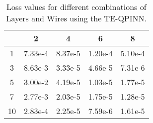 \documentclass{article}
\begin{document}
    
    \begin{table}[h]
    \centering
    \begin{tabular}{@{}c S[table-format=1.2e-1,mode=text] S[table-format=1.2e-1,mode=text] S[table-format=1.2e-1,mode=text] S[table-format=1.2e-1,mode=text]@{}}
    \toprule
     & {2} & {4} & {6} & {8} \\
      & 7.33e-4 & 8.37e-5 & 1.20e-4 & 5.10e-4 \\
    3  & 8.63e-3 & 3.33e-5 & 4.66e-5 & 7.31e-6 \\
    5  & 3.00e-2 & 4.19e-5 & 1.03e-5 & 1.77e-5 \\
    7  & 2.77e-3 & 2.03e-5 & 1.75e-5 & 1.28e-5 \\
    10 & 2.83e-4 & 2.25e-5 & 7.59e-6 & 1.61e-5 \\
    \bottomrule
    \end{tabular}
    \caption{Loss values for different combinations of Layers and Wires using the TE-QPINN.}
    \label{tab:loss_values}
\end{table}
    
\end{document}
